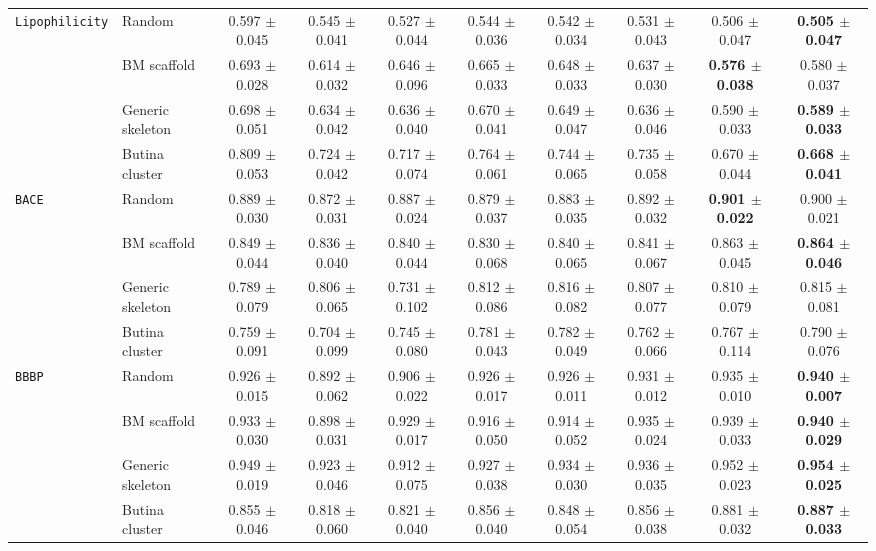 \documentclass[journal=jcisd8,manuscript=article]{achemso}
\begin{document}
\begin{table}
{\begin{tabular}{llcccccccc}
\midrule
\texttt{Lipophilicity} & Random & 0.597 $\pm$ 0.045 & 0.545 $\pm$ 0.041 & 0.527 $\pm$ 0.044 & 0.544 $\pm$ 0.036 & 0.542 $\pm$ 0.034 & 0.531 $\pm$ 0.043 & 0.506 $\pm$ 0.047 & \textbf{0.505 $\pm$ 0.047} \\
 & BM scaffold & 0.693 $\pm$ 0.028 & 0.614 $\pm$ 0.032 & 0.646 $\pm$ 0.096 & 0.665 $\pm$ 0.033 & 0.648 $\pm$ 0.033 & 0.637 $\pm$ 0.030 & \textbf{0.576 $\pm$ 0.038} & 0.580 $\pm$ 0.037 \\
 & Generic skeleton & 0.698 $\pm$ 0.051 & 0.634 $\pm$ 0.042 & 0.636 $\pm$ 0.040 & 0.670 $\pm$ 0.041 & 0.649 $\pm$ 0.047 & 0.636 $\pm$ 0.046 & 0.590 $\pm$ 0.033 & \textbf{0.589 $\pm$ 0.033} \\
 & Butina cluster & 0.809 $\pm$ 0.053 & 0.724 $\pm$ 0.042 & 0.717 $\pm$ 0.074 & 0.764 $\pm$ 0.061 & 0.744 $\pm$ 0.065 & 0.735 $\pm$ 0.058 & 0.670 $\pm$ 0.044 & \textbf{0.668 $\pm$ 0.041} \\
\midrule
\texttt{BACE} & Random & 0.889 $\pm$ 0.030 & 0.872 $\pm$ 0.031 & 0.887 $\pm$ 0.024 & 0.879 $\pm$ 0.037 & 0.883 $\pm$ 0.035 & 0.892 $\pm$ 0.032 & \textbf{0.901 $\pm$ 0.022} & 0.900 $\pm$ 0.021 \\
 & BM scaffold & 0.849 $\pm$ 0.044 & 0.836 $\pm$ 0.040 & 0.840 $\pm$ 0.044 & 0.830 $\pm$ 0.068 & 0.840 $\pm$ 0.065 & 0.841 $\pm$ 0.067 & 0.863 $\pm$ 0.045 & \textbf{0.864 $\pm$ 0.046} \\
 & Generic skeleton & 0.789 $\pm$ 0.079 & 0.806 $\pm$ 0.065 & 0.731 $\pm$ 0.102 & 0.812 $\pm$ 0.086 & 0.816 $\pm$ 0.082 & 0.807 $\pm$ 0.077 & 0.810 $\pm$ 0.079 & 0.815 $\pm$ 0.081 \\
 & Butina cluster & 0.759 $\pm$ 0.091 & 0.704 $\pm$ 0.099 & 0.745 $\pm$ 0.080 & 0.781 $\pm$ 0.043 & 0.782 $\pm$ 0.049 & 0.762 $\pm$ 0.066 & 0.767 $\pm$ 0.114 & 0.790 $\pm$ 0.076 \\
\midrule
\texttt{BBBP} & Random & 0.926 $\pm$ 0.015 & 0.892 $\pm$ 0.062 & 0.906 $\pm$ 0.022 & 0.926 $\pm$ 0.017 & 0.926 $\pm$ 0.011 & 0.931 $\pm$ 0.012 & 0.935 $\pm$ 0.010 & \textbf{0.940 $\pm$ 0.007} \\
 & BM scaffold & 0.933 $\pm$ 0.030 & 0.898 $\pm$ 0.031 & 0.929 $\pm$ 0.017 & 0.916 $\pm$ 0.050 & 0.914 $\pm$ 0.052 & 0.935 $\pm$ 0.024 & 0.939 $\pm$ 0.033 & \textbf{0.940 $\pm$ 0.029} \\
 & Generic skeleton & 0.949 $\pm$ 0.019 & 0.923 $\pm$ 0.046 & 0.912 $\pm$ 0.075 & 0.927 $\pm$ 0.038 & 0.934 $\pm$ 0.030 & 0.936 $\pm$ 0.035 & 0.952 $\pm$ 0.023 & \textbf{0.954 $\pm$ 0.025} \\
 & Butina cluster & 0.855 $\pm$ 0.046 & 0.818 $\pm$ 0.060 & 0.821 $\pm$ 0.040 & 0.856 $\pm$ 0.040 & 0.848 $\pm$ 0.054 & 0.856 $\pm$ 0.038 & 0.881 $\pm$ 0.032 & \textbf{0.887 $\pm$ 0.033} \\
\bottomrule
\end{tabular}}
\end{table}
\end{document}
